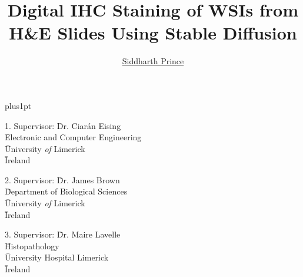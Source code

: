 \documentclass[twoside,12pt]{Latex/Classes/PhDthesisPSnPDF}
\title{Digital IHC Staining of WSIs from
H\&E Slides Using Stable Diffusion}
\author{\href{mailto: sprince.ie.31@gmail.com}{Siddharth Prince}}
\begin{document}



\renewcommand\baselinestretch{1.2}
\baselineskip=18pt plus1pt



\maketitle  %



\newpage


 \begin{tabbing}
1.  Supervisor: \= Dr. Ciarán Eising    \\
 \>  \= Electronic and Computer Engineering\\
 \>  \= University \emph{of} Limerick \\
 \>  \= Ireland \\
 \end{tabbing}


 \begin{tabbing}
2. Supervisor: \= Dr. James Brown \\
 \>  \= Department of Biological Sciences \\
 \>  \= University \emph{of} Limerick \\
 \>  \= Ireland \\
\end{tabbing}

\begin{tabbing}
3. Supervisor: \= Dr. Maire Lavelle \\
 \>  \= Histopathology \\
 \>  \= University Hospital Limerick \\
 \>  \= Ireland \\
\end{tabbing}


\vspace{10mm}




\end{document}
